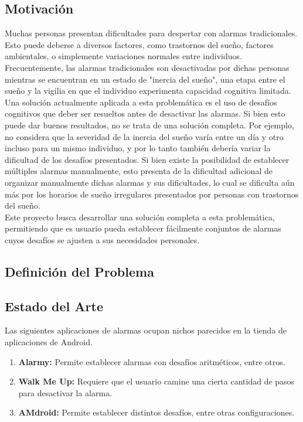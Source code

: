 \documentclass[letterpaper, 10pt]{article}
\begin{document}
\subsection{Motivación}
Muchas personas presentan dificultades para despertar con alarmas tradicionales. Esto puede deberse a diversos factores, como trastornos del sueño, factores ambientales, o simplemente variaciones normales entre individuos. Frecuentemente, las alarmas tradicionales son desactivadas por dichas personas mientras se encuentran en un estado de "inercia del sueño", una etapa entre el sueño y la vigilia en que el individuo experimenta capacidad cognitiva limitada.
\\
Una solución actualmente aplicada a esta problemática es el uso de desafíos cognitivos que deber ser resueltos antes de desactivar las alarmas. Si bien esto puede dar buenos resultados, no se trata de una solución completa. Por ejemplo, no considera que la severidad de la inercia del sueño varía entre un día y otro incluso para un mismo individuo, y por lo tanto también debería variar la dificultad de los desafíos presentados. Si bien existe la posibilidad de establecer múltiples alarmas manualmente, esto presenta de la dificultad adicional de organizar manualmente dichas alarmas y sus dificultades, lo cual se dificulta aún más por los horarios de sueño irregulares presentados por personas con trastornos del sueño.
\\
Este proyecto busca desarrollar una solución completa a esta problemática, permitiendo que es usuario pueda establecer fácilmente conjuntos de alarmas cuyos desafíos se ajusten a sus necesidades personales.

\subsection{Definición del Problema}
\subsection{Estado del Arte}
	Las siguientes aplicaciones de alarmas ocupan nichos parecidos en la tienda de aplicaciones de Android.

	\begin{enumerate}
		\item[] \textbf{Alarmy:} Permite establecer alarmas con desafíos aritméticos, entre otros.
		\item[] \textbf{Walk Me Up:} Requiere que el usuario camine una cierta cantidad de pasos para desactivar la alarma.
		\item[] \textbf{AMdroid:} Permite establecer distintos desafíos, entre otras configuraciones.
	\end{enumerate}
\end{document}
